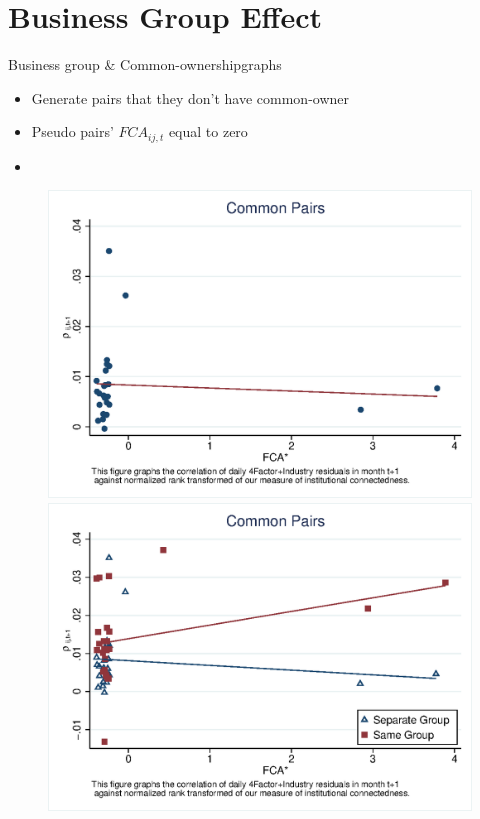 \documentclass{beamer}
\begin{document}
	
	
	
	
	
	
	
	
	
	\section{Business Group Effect}
	\begin{frame}{Business group \& Common-ownership}{graphs}
		\begin{itemize}
			\item Generate pairs  that they don't have common-owner 
			\item Pseudo pairs' $ FCA_{ij,t} $ equal to zero
			\item 
		\end{itemize}
		\begin{figure}
			\centering
			\includegraphics[width=0.45\linewidth]{mcorr5AllPairs.eps}
			\includegraphics[width=0.45\linewidth]{mcorr5bgAllPairs.eps}

			\label{fig:zeropbgsample}
		\end{figure}
		
	\end{frame}





	
	
	
\end{document}
